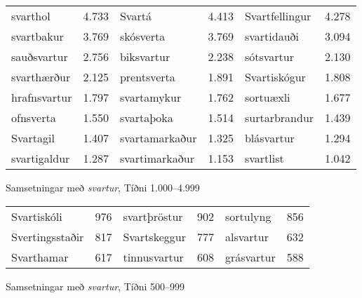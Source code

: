 \documentclass[../samsetningasafn.tex]{subfiles}
\begin{document}
\begin{wordlist}[ht!]
\begin{tcolorbox}

	\setlength{\extrarowheight}{3pt}
	\begin{tabular}{BlBlBl}
		svarthol	& 4.733	& 
		Svartá	& 4.413	& 
		Svartfellingur & 4.278	\\ 
		svartbakur	& 3.769	& 
		skósverta	& 3.769	& 
		svartidauði	& 3.094	\\ 
		sauðsvartur	& 2.756	& 
		biksvartur	& 2.238	& 
		sótsvartur	& 2.130	\\ 
		svarthærður	& 2.125	& 
		prentsverta	& 1.891	& 
		Svartiskógur	& 1.808	\\ 
		hrafnsvartur	& 1.797	& 
		svartamykur	& 1.762	& 
		sortuæxli	& 1.677	\\ 
		ofnsverta	& 1.550	& 
		svartaþoka	& 1.514	& 
		surtarbrandur & 1.439	\\ 
		Svartagil	& 1.407	& 
		svartamarkaður & 1.325	& 
		blásvartur 	& 1.294	\\ 
		svartigaldur	& 1.287	& 
		svartimarkaður & 1.153	& 
		svartlist	& 1.042	 
	\end{tabular}

\end{tcolorbox}
	\caption{Samsetningar með \textit{svartur}, Tíðni 1.000--4.999}
	\label{listi:svart.1000}
\end{wordlist}
\clearpage

\phantom{bil}
\vspace{12pt}
\begin{wordlist}[ht!]
\begin{tcolorbox}

	\setlength{\extrarowheight}{3pt}
	\begin{tabular}{BlBlBl}
		Svartiskóli 	& 976		& 
		svartþröstur	& 902		& 
		sortulyng	& 856		\\ 
		Svertingsstaðir & 817	& 
		Svartskeggur & 777		& 
		alsvartur	& 632		\\ 
		Svarthamar	& 617		& 
		tinnusvartur	& 608		& 
		grásvartur 	& 588		 
	\end{tabular}

\end{tcolorbox}
	\caption{Samsetningar með \textit{svartur}, Tíðni 500--999}
	\label{listi:svart.500}
\end{wordlist}	
	
\end{document}
